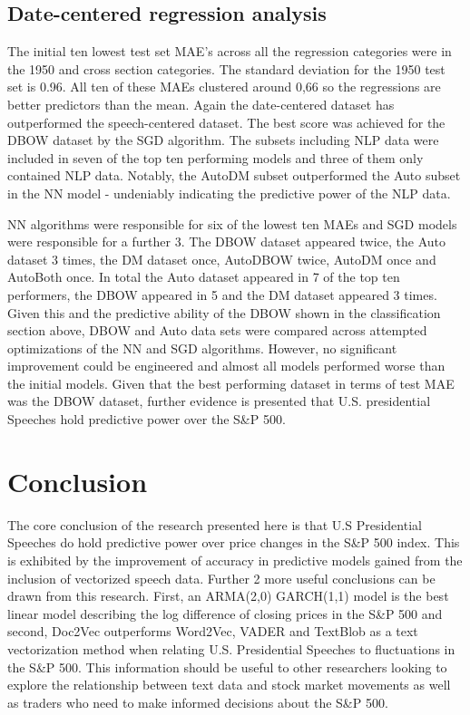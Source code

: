 \documentclass[11pt,preprint, authoryear]{elsarticle}
\numberwithin{equation}{section}
\numberwithin{figure}{section}
\numberwithin{table}{section}
\begin{document}
\hypertarget{date-centered-regression-analysis}{%
\subsection{Date-centered regression
analysis}\label{date-centered-regression-analysis}}

The initial ten lowest test set MAE's across all the regression
categories were in the 1950 and cross section categories. The standard
deviation for the 1950 test set is 0.96. All ten of these MAEs clustered
around 0,66 so the regressions are better predictors than the mean.
Again the date-centered dataset has outperformed the speech-centered
dataset. The best score was achieved for the DBOW dataset by the SGD
algorithm. The subsets including NLP data were included in seven of the
top ten performing models and three of them only contained NLP data.
Notably, the AutoDM subset outperformed the Auto subset in the NN model
- undeniably indicating the predictive power of the NLP data.

NN algorithms were responsible for six of the lowest ten MAEs and SGD
models were responsible for a further 3. The DBOW dataset appeared
twice, the Auto dataset 3 times, the DM dataset once, AutoDBOW twice,
AutoDM once and AutoBoth once. In total the Auto dataset appeared in 7
of the top ten performers, the DBOW appeared in 5 and the DM dataset
appeared 3 times. Given this and the predictive ability of the DBOW
shown in the classification section above, DBOW and Auto data sets were
compared across attempted optimizations of the NN and SGD algorithms.
However, no significant improvement could be engineered and almost all
models performed worse than the initial models. Given that the best
performing dataset in terms of test MAE was the DBOW dataset, further
evidence is presented that U.S. presidential Speeches hold predictive
power over the S\&P 500.

\hypertarget{conclusion}{%
\section{Conclusion}\label{conclusion}}

The core conclusion of the research presented here is that U.S
Presidential Speeches do hold predictive power over price changes in the
S\&P 500 index. This is exhibited by the improvement of accuracy in
predictive models gained from the inclusion of vectorized speech data.
Further 2 more useful conclusions can be drawn from this research.
First, an ARMA(2,0) GARCH(1,1) model is the best linear model describing
the log difference of closing prices in the S\&P 500 and second, Doc2Vec
outperforms Word2Vec, VADER and TextBlob as a text vectorization method
when relating U.S. Presidential Speeches to fluctuations in the S\&P
500. This information should be useful to other researchers looking to
explore the relationship between text data and stock market movements as
well as traders who need to make informed decisions about the S\&P 500.
\end{document}
